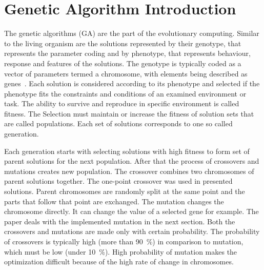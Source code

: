 \section{Genetic Algorithm Introduction}
The genetic algorithms (GA) are the part of the evolutionary computing. Similar to the living organism are the solutions represented by their genotype, that represents the parameter coding and by phenotype, that represents behaviour, response and features of the solutions. The genotype is typically coded as a vector of parameters termed a chromosome, with elements being described as genes~\cite{Fogel2006}. Each solution is considered according to its phenotype and selected if the phenotype fits the constraints and conditions of an examined environment or task. The ability to survive and reproduce in specific environment is called fitness. The Selection must maintain or increase the fitness of solution sets that are called populations. Each set of solutions corresponds to one so called generation.

Each generation starts with selecting solutions with high fitness to form set of parent solutions for the next population. After that the process of crossovers and mutations creates new population. The crossover combines two chromosomes of parent solutions together. The one-point crossover was used in presented solutions. Parent chromosomes are randomly split at the same point and the parts that follow that point are exchanged. The mutation changes the chromosome directly. It can change the value of a selected gene for example. The paper deals with the implemented mutation in the next section. Both the crossovers and mutations are made only with certain probability. The probability of crossovers is typically high (more than 90~\%) in comparison to mutation, which must be low (under 10~\%). High probability of mutation makes the optimization difficult because of the high rate of change in chromosomes.
